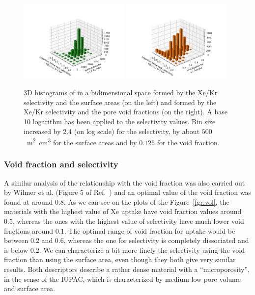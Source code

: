 \documentclass[main.tex]{subfiles}
\begin{document}
\begin{figure}[h!]
  \centering
  \includegraphics[width=0.48\textwidth]{figures/2-thermo/3D_hist_selec_SA.pdf}
  \includegraphics[width=0.48\textwidth]{figures/2-thermo/3D_hist_selec_vol.pdf}
  \caption{3D histograms of in a bidimensional space formed by the Xe/Kr selectivity and the surface areas (on the left) and formed by the Xe/Kr selectivity and the pore void fractions (on the right). A base 10 logarithm has been applied to the selectivity values. Bin size increased by 2.4 (on log scale) for the selectivity, by about $500$~\si{\square\meter\cubic\centi\meter} for the surface areas and by $0.125$ for the void fraction. }\label{fgr:3D_hist_sa_vol}
\end{figure}

\subsubsection{Void fraction and selectivity}

A similar analysis of the relationship with the void fraction was also carried out by Wilmer et al. (Figure 5 of Ref.~\cite{Wilmer_2012}) and an optimal value of the void fraction was found at around $0.8$. As we can see on the plots of the Figure~\ref{fgr:vol}, the materials with the highest value of Xe uptake have void fraction values around $0.5$, whereas the ones with the highest value of selectivity have much lower void fractions around $0.1$. The optimal range of void fraction for uptake would be between $0.2$ and $0.6$, whereas the one for selectivity is completely dissociated and is below $0.2$. We can characterize a bit more finely the selectivity using the void fraction than using the surface area, even though they both give very similar results. Both descriptors describe a rather dense material with a ``microporosity'', in the sense of the IUPAC\autocite{Sing_1985}, which is characterized by medium-low pore volume and surface area.
\end{document}
